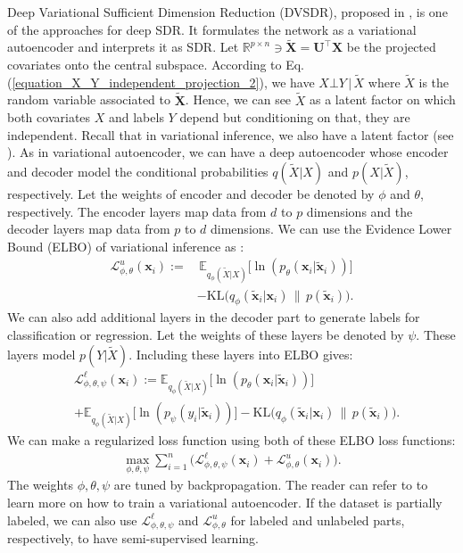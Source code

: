 \documentclass[lang=cn,10pt]{gorgeousnbook}
\numberwithin{equation}{section}%
\numberwithin{figure}{section}%
\begin{document}
Deep Variational Sufficient Dimension Reduction (DVSDR), proposed in \cite{banijamali2018deep}, is one of the approaches for deep SDR. 
It formulates the network as a variational autoencoder \cite{kingma2014auto,ghojogh2021factor} and interprets it as SDR. 
Let $\mathbb{R}^{p \times n} \ni \widetilde{\boldsymbol{X}} = \boldsymbol{U}^\top \boldsymbol{X}$ be the projected covariates onto the central subspace. 
According to Eq. (\ref{equation_X_Y_independent_projection_2}), we have $X \bot Y\, |\, \widetilde{X}$ where $\widetilde{X}$ is the random variable associated to $\widetilde{\boldsymbol{X}}$. Hence, we can see $\widetilde{X}$ as a latent factor on which both covariates $X$ and labels $Y$ depend but conditioning on that, they are independent. Recall that in variational inference, we also have a latent factor (see \cite{ghojogh2021factor}). 
As in variational autoencoder, we can have a deep autoencoder whose encoder and decoder model the conditional probabilities $q(\widetilde{X} | X)$ and $p(X | \widetilde{X})$, respectively. 
Let the weights of encoder and decoder be denoted by $\phi$ and $\theta$, respectively. 
The encoder layers map data from $d$ to $p$ dimensions and the decoder layers map data from $p$ to $d$ dimensions.
We can use the Evidence Lower Bound (ELBO) of variational inference as \cite{ghojogh2021factor}:
\begin{align*}
\mathcal{L}_{\phi, \theta}^u(\boldsymbol{x}_i) := &\,\mathbb{E}_{q_{\phi}(\widetilde{X} | X)}\big[\ln(p_\theta(\boldsymbol{x}_i | \widetilde{\boldsymbol{x}}_i))\big] \\
&- \text{KL}\big(q_\phi(\widetilde{\boldsymbol{x}}_i | \boldsymbol{x}_i)\, \|\, p(\widetilde{\boldsymbol{x}}_i) \big).
\end{align*}
We can also add additional layers in the decoder part to generate labels for classification or regression. Let the weights of these layers be denoted by $\psi$. These layers model $p(Y | \widetilde{X})$. Including these layers into ELBO gives:
\begin{align*}
&\mathcal{L}_{\phi, \theta, \psi}^\ell(\boldsymbol{x}_i) := \mathbb{E}_{q_{\phi}(\widetilde{X} | X)}\big[\ln(p_\theta(\boldsymbol{x}_i | \widetilde{\boldsymbol{x}}_i))\big] \\
&+ \mathbb{E}_{q_{\phi}(\widetilde{X} | X)}\big[\ln(p_\psi(y_i | \widetilde{\boldsymbol{x}}_i))\big] - \text{KL}\big(q_\phi(\widetilde{\boldsymbol{x}}_i | \boldsymbol{x}_i)\, \|\, p(\widetilde{\boldsymbol{x}}_i) \big).
\end{align*}
We can make a regularized loss function using both of these ELBO loss functions:
\begin{align*}
\max_{\phi, \theta, \psi} \sum_{i=1}^n \big( \mathcal{L}_{\phi, \theta, \psi}^\ell(\boldsymbol{x}_i) + \mathcal{L}_{\phi, \theta}^u(\boldsymbol{x}_i) \big). 
\end{align*}
The weights $\phi, \theta, \psi$ are tuned by backpropagation. 
The reader can refer to \cite{ghojogh2021factor} to learn more on how to train a variational autoencoder. 
If the dataset is partially labeled, we can also use $\mathcal{L}_{\phi, \theta, \psi}^\ell$ and $\mathcal{L}_{\phi, \theta}^u$ for labeled and unlabeled parts, respectively, to have semi-supervised learning.  
\end{document}
